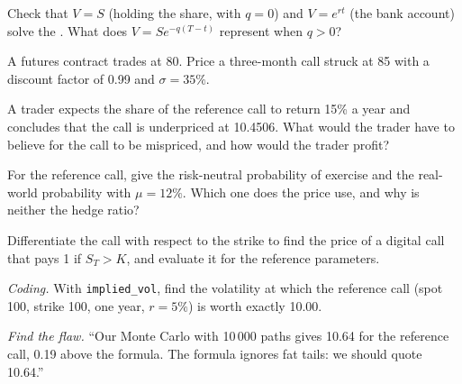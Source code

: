 \begin{exercise}[$\star$]\label{exo:dv:black-scholes-three-ways:2}
Check that $V=S$ (holding the share, with $q=0$) and $V=e^{rt}$ (the bank account)
solve the . What does $V=Se^{-q(T-t)}$ represent when
$q>0$?
\end{exercise}

\begin{exercise}[$\star$]\label{exo:dv:black-scholes-three-ways:3}
A futures contract trades at 80. Price a three-month call struck at 85 with a
discount factor of 0.99 and $\sigma=35\%$.
\end{exercise}

\begin{exercise}[$\star\star$]\label{exo:dv:black-scholes-three-ways:4}
A trader expects the share of the reference call to return 15\% a year and
concludes that the call is underpriced at 10.4506. What would the trader have to
believe for the call to be mispriced, and how would the trader profit?
\end{exercise}

\begin{exercise}[$\star\star$]\label{exo:dv:black-scholes-three-ways:5}
For the reference call, give the risk-neutral probability of exercise and the
real-world probability with $\mu=12\%$. Which one does the price use, and why is
neither the hedge ratio?
\end{exercise}

\begin{exercise}[$\star\star$]\label{exo:dv:black-scholes-three-ways:6}
Differentiate the call with respect to the strike to find the price of a digital
call that pays 1 if $S_T>K$, and evaluate it for the reference parameters.
\end{exercise}

\begin{exercise}[$\star\star\star$]\label{exo:dv:black-scholes-three-ways:7}
\emph{Coding.} With \texttt{implied\_vol}, find the volatility at which the
reference call (spot 100, strike 100, one year, $r=5\%$) is worth exactly 10.00.
\end{exercise}

\begin{exercise}[$\star\star\star$]\label{exo:dv:black-scholes-three-ways:8}
\emph{Find the flaw.} ``Our Monte Carlo with 10\,000 paths gives 10.64 for the
reference call, 0.19 above the formula. The formula ignores fat tails: we should
quote 10.64.''
\end{exercise}

